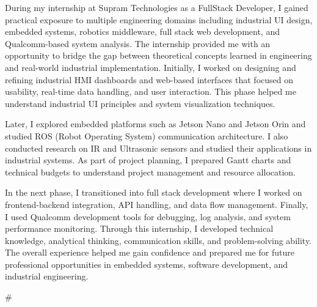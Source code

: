 \documentclass[12pt,a4paper]{report}
\begin{document}
\vspace{0.5cm}

During my internship at Supram Technologies as a FullStack Developer, I gained practical exposure to multiple engineering domains including industrial UI design, embedded systems, robotics middleware, full stack web development, and Qualcomm-based system analysis. The internship provided me with an opportunity to bridge the gap between theoretical concepts learned in engineering and real-world industrial implementation. Initially, I worked on designing and refining industrial HMI dashboards and web-based interfaces that focused on usability, real-time data handling, and user interaction. This phase helped me understand industrial UI principles and system visualization techniques.


Later, I explored embedded platforms such as Jetson Nano and Jetson Orin and studied ROS (Robot Operating System) communication architecture. I also conducted research on IR and Ultrasonic sensors and studied their applications in industrial systems. As part of project planning, I prepared Gantt charts and technical budgets to understand project management and resource allocation.


In the next phase, I transitioned into full stack development where I worked on frontend-backend integration, API handling, and data flow management. Finally, I used Qualcomm development tools for debugging, log analysis, and system performance monitoring. Through this internship, I developed technical knowledge, analytical thinking, communication skills, and problem-solving ability. The overall experience helped me gain confidence and prepared me for future professional opportunities in embedded systems, software development, and industrial engineering.


\#


\newpage
\tableofcontents

\newpage
\listoffigures
\end{document}
